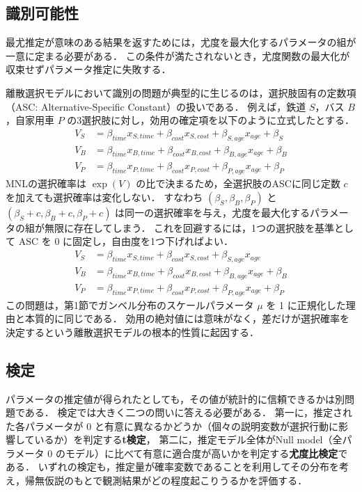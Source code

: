 \subsection{識別可能性}\label{ssec:est_unique}
最尤推定が意味のある結果を返すためには，尤度を最大化するパラメータの組が一意に定まる必要がある．
この条件が満たされないとき，尤度関数の最大化が収束せずパラメータ推定に失敗する．

離散選択モデルにおいて識別の問題が典型的に生じるのは，選択肢固有の定数項（ASC: Alternative-Specific Constant）の扱いである．
例えば，鉄道 $S$，バス $B$，自家用車 $P$ の3選択肢に対し，効用の確定項を以下のように立式したとする．
\begin{equation}
    \label{eq:utility_bad}
    \begin{aligned}
        V_S & =\beta_{time}x_{S,time}+\beta_{cost} x_{S,cost}+\beta_{S,age}x_{age}+\beta_S \\
        V_B & =\beta_{time}x_{B,time}+\beta_{cost} x_{B,cost}+\beta_{B,age}x_{age}+\beta_B \\
        V_P & =\beta_{time}x_{P,time}+\beta_{cost} x_{P,cost}+\beta_{P,age}x_{age}+\beta_P
    \end{aligned}
\end{equation}
MNLの選択確率は $\exp(V)$ の比で決まるため，全選択肢のASCに同じ定数 $c$ を加えても選択確率は変化しない．
すなわち $(\beta_S, \beta_B, \beta_P)$ と $(\beta_S + c, \beta_B + c, \beta_P + c)$ は同一の選択確率を与え，尤度を最大化するパラメータの組が無限に存在してしまう．
これを回避するには，1つの選択肢を基準として ASC を 0 に固定し，自由度を1つ下げればよい．
\begin{equation}
    \label{eq:utility_good}
    \begin{aligned}
        V_S & =\beta_{time}x_{S,time}+\beta_{cost} x_{S,cost}+\beta_{S,age}x_{age}         \\
        V_B & =\beta_{time}x_{B,time}+\beta_{cost} x_{B,cost}+\beta_{B,age}x_{age}+\beta_B \\
        V_P & =\beta_{time}x_{P,time}+\beta_{cost} x_{P,cost}+\beta_{P,age}x_{age}+\beta_P
    \end{aligned}
\end{equation}
この問題は，第1節でガンベル分布のスケールパラメータ $\mu$ を 1 に正規化した理由と本質的に同じである．
効用の絶対値には意味がなく，差だけが選択確率を決定するという離散選択モデルの根本的性質に起因する．


\subsection{検定}\label{ch:testing}
パラメータの推定値が得られたとしても，その値が統計的に信頼できるかは別問題である．
検定では大きく二つの問いに答える必要がある．
第一に，推定された各パラメータが $0$ と有意に異なるかどうか（個々の説明変数が選択行動に影響しているか）を判定する\textbf{t検定}，
第二に，推定モデル全体がNull model（全パラメータ $0$ のモデル）に比べて有意に適合度が高いかを判定する\textbf{尤度比検定}である．
いずれの検定も，推定量が確率変数であることを利用してその分布を考え，帰無仮説のもとで観測結果がどの程度起こりうるかを評価する．

